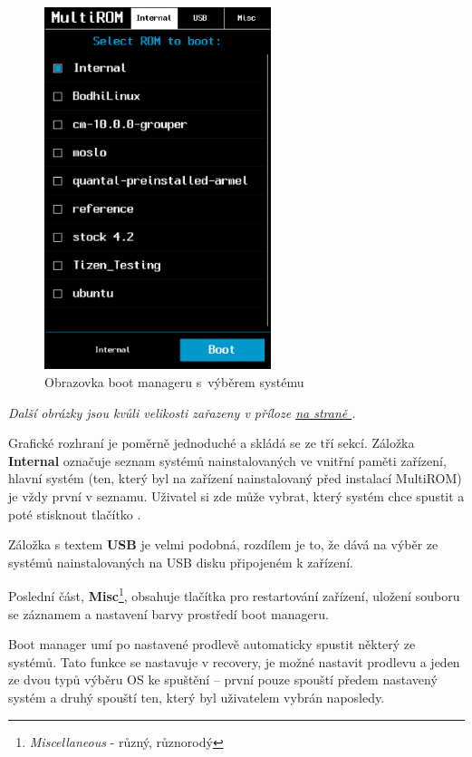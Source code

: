 \documentclass[12pt, a4paper, oneside]{article}
\newcommand{\B}{\textbf} %
\newcommand{\It}{\textit}  %
\newcommand*{\attref}[1]{\hyperref[{#1}]{\uv{\nameref*{#1}} na straně \pageref{#1}}}
\begin{document}
\begin{figure}[H]
\begin{center}
 \includegraphics[width=250px]{img/boot_manager.png}
\caption{Obrazovka boot manageru s~výběrem systému}
\end{center}
\end{figure}
\vspace{-20pt}
\noindent \It{Další obrázky jsou kvůli velikosti zařazeny v příloze \attref{sec:obrazky}.}

Grafické rozhraní je poměrně jednoduché a skládá se ze tří sekcí. Záložka \B{Internal} označuje seznam systémů nainstalovaných ve vnitřní paměti zařízení, hlavní systém (ten, který byl na zařízení nainstalovaný před instalací MultiROM) je vždy první v seznamu. Uživatel si zde může vybrat, který systém chce spustit a poté stisknout tlačítko .

Záložka s textem \B{USB} je velmi podobná, rozdílem je to, že dává na výběr ze systémů nainstalovaných na USB disku připojeném k zařízení.

Poslední část, \B{Misc}\footnote{\It{Miscellaneous} - různý, různorodý}, obsahuje tlačítka pro restartování zařízení, uložení souboru se záznamem a nastavení barvy prostředí boot manageru.

Boot manager umí po nastavené prodlevě automaticky spustit některý ze systémů. Tato funkce se nastavuje v recovery, je možné nastavit prodlevu a jeden ze dvou typů výběru OS ke spuštění -- první pouze spouští předem nastavený systém a druhý spouští ten, který byl uživatelem vybrán naposledy.
\end{document}
